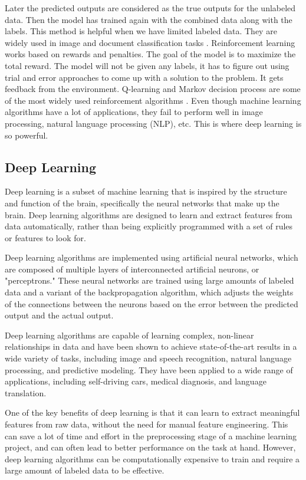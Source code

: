 \documentclass{book}
\begin{document}
	Later the predicted outputs are considered as the true outputs for the unlabeled data. Then the model has trained again with the combined data along with the labels. This method is helpful when we have limited labeled data. They are widely used in image and document classification tasks \cite{yoon2017semi}. Reinforcement learning works based on rewards and penalties. The goal of the model is to maximize the total reward. The model will not be given any labels, it has to figure out using trial and error approaches to come up with a solution to the problem. It gets feedback from the environment. Q-learning and Markov decision process are some of the most widely used reinforcement algorithms \cite{sutton2018reinforcement}.
	Even though machine learning algorithms have a lot of applications, they fail to perform well in image processing, natural language processing (NLP), etc. This is where deep learning is so powerful.
	
	\subsection{Deep Learning}
	Deep learning is a subset of machine learning that is inspired by the structure and function of the brain, specifically the neural networks that make up the brain. Deep learning algorithms are designed to learn and extract features from data automatically, rather than being explicitly programmed with a set of rules or features to look for.
	
	Deep learning algorithms are implemented using artificial neural networks, which are composed of multiple layers of interconnected artificial neurons, or "perceptrons." These neural networks are trained using large amounts of labeled data and a variant of the backpropagation algorithm, which adjusts the weights of the connections between the neurons based on the error between the predicted output and the actual output.
	
	Deep learning algorithms are capable of learning complex, non-linear relationships in data and have been shown to achieve state-of-the-art results in a wide variety of tasks, including image and speech recognition, natural language processing, and predictive modeling. They have been applied to a wide range of applications, including self-driving cars, medical diagnosis, and language translation.
	
	One of the key benefits of deep learning is that it can learn to extract meaningful features from raw data, without the need for manual feature engineering. This can save a lot of time and effort in the preprocessing stage of a machine learning project, and can often lead to better performance on the task at hand. However, deep learning algorithms can be computationally expensive to train and require a large amount of labeled data to be effective.
	
\end{document}
